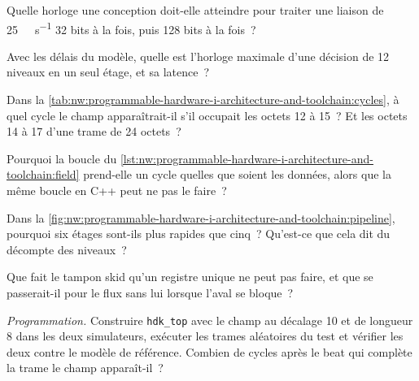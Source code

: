 \begin{exercise}[$\star$]\label{exo:nw:programmable-hardware-i-architecture-and-toolchain:1}
Quelle horloge une conception doit-elle atteindre pour traiter une liaison de \qty{25}{\giga\bit\per\second} 32 bits à la fois, puis 128 bits à la fois~?
\end{exercise}

\begin{exercise}[$\star$]\label{exo:nw:programmable-hardware-i-architecture-and-toolchain:2}
Avec les délais du modèle, quelle est l'horloge maximale d'une décision de 12 niveaux en un seul étage, et sa latence~?
\end{exercise}

\begin{exercise}[$\star$]\label{exo:nw:programmable-hardware-i-architecture-and-toolchain:3}
Dans la \cref{tab:nw:programmable-hardware-i-architecture-and-toolchain:cycles}, à quel cycle le champ apparaîtrait-il s'il occupait les octets 12 à
15~? Et les octets 14 à 17 d'une trame de 24 octets~?
\end{exercise}

\begin{exercise}[$\star\star$]\label{exo:nw:programmable-hardware-i-architecture-and-toolchain:4}
Pourquoi la boucle du \cref{lst:nw:programmable-hardware-i-architecture-and-toolchain:field} prend-elle un cycle quelles que soient les données, alors que la
même boucle en C++ peut ne pas le faire~?
\end{exercise}

\begin{exercise}[$\star\star$]\label{exo:nw:programmable-hardware-i-architecture-and-toolchain:5}
Dans la \cref{fig:nw:programmable-hardware-i-architecture-and-toolchain:pipeline}, pourquoi six étages sont-ils plus rapides que cinq~? Qu'est-ce que cela dit
du décompte des niveaux~?
\end{exercise}

\begin{exercise}[$\star\star$]\label{exo:nw:programmable-hardware-i-architecture-and-toolchain:6}
Que fait le tampon skid qu'un registre unique ne peut pas faire, et que se passerait-il pour le flux sans lui lorsque l'aval se bloque~?
\end{exercise}

\begin{exercise}[$\star\star\star$]\label{exo:nw:programmable-hardware-i-architecture-and-toolchain:7}
\emph{Programmation.} Construire \texttt{hdk\_top} avec le champ au décalage 10 et de longueur 8 dans les deux simulateurs, exécuter les trames aléatoires du test et
vérifier les deux contre le modèle de référence. Combien de cycles après le beat qui complète la trame le champ apparaît-il~?
\end{exercise}

